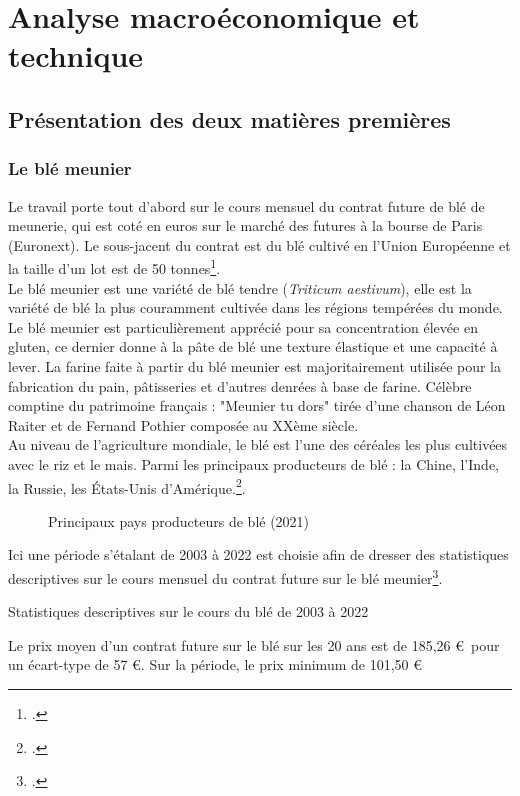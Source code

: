 \section{Analyse macroéconomique et technique}
\subsection{Présentation des deux matières premières}
\subsubsection{Le blé meunier}
Le travail porte tout d'abord sur le cours mensuel du contrat future de blé de meunerie, qui est coté en euros sur le marché des futures à la bourse de 
Paris (Euronext). Le sous-jacent du contrat est du blé cultivé en l'Union Européenne et la taille d'un lot est de 50 tonnes\footcite{euronext_ble}. \\[11pt]
Le blé meunier est une variété de blé tendre (\textit{Triticum aestivum}), elle est la variété de blé la plus couramment cultivée dans les régions tempérées 
du monde. Le blé meunier est particulièrement apprécié pour sa concentration élevée en gluten, ce dernier donne à la pâte de blé une texture élastique et une capacité à 
lever. La farine faite à partir du blé meunier est majoritairement utilisée pour la fabrication du pain, pâtisseries et d'autres denrées à base de farine. Célèbre comptine 
du patrimoine français : "Meunier tu dors" tirée d'une chanson de Léon Raiter et de Fernand Pothier composée au XXème siècle.\\[11pt]
Au niveau de l'agriculture mondiale, le blé est l'une des céréales les plus cultivées avec le riz et le mais. Parmi les principaux
producteurs de blé : la Chine, l'Inde, la Russie, les États-Unis d'Amérique.\footcite{fao_2021}.
\begin{figure}[H]
    \centering
    \label{fig:ble_prod}
    \resizebox{0.8\textwidth}{!}{}
    \caption{Principaux pays producteurs de blé (2021)}
\end{figure}
Ici une période s'étalant de 2003 à 2022 est choisie afin de dresser des statistiques descriptives sur le cours mensuel du contrat future sur le blé meunier\footcite{ble}. 
\begin{table}[H]
    \centering
    \caption{Statistiques descriptives sur le cours du blé de 2003 à 2022}
    \sffamily
    
\end{table}
Le prix moyen d'un contrat future sur le blé sur les 20 ans est de 185,26 \euro\ pour un écart-type de 57 \euro. Sur la période, le prix minimum de 101,50 \euro\ 
